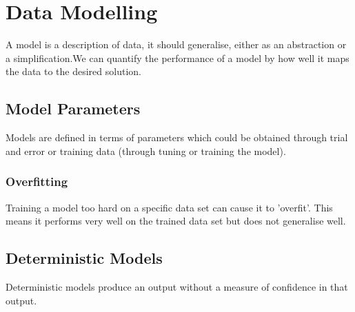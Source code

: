 \section{Data Modelling}

A model is a description of data, it should generalise, either as 
an abstraction or a simplification.We can quantify the performance 
of a model by how well it maps the data to the desired solution.

\subsection{Model Parameters}

Models are defined in terms of parameters which could be obtained
through trial and error or training data (through tuning or
training the model).

\subsubsection{Overfitting}

Training a model too hard on a specific data set can cause it
to 'overfit'. This means it performs very well on the trained
data set but does not generalise well.

\subsection{Deterministic Models}

Deterministic models produce an output without a measure of
confidence in that output.
